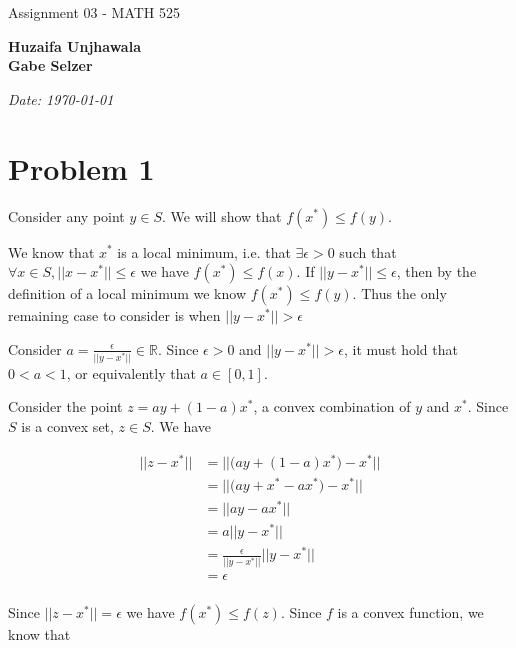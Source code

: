 \documentclass[11pt]{article}
\begin{document}
\begin{titlepage}
    \centering
    \vspace*{0.5cm}
    \par\normalfont\fontsize{35}{35}\sffamily\selectfont
    Assignment 03 - MATH 525\par 
    \vspace*{1cm}
    {\huge\bfseries Huzaifa Unjhawala \\  Gabe Selzer \par} 
    \vspace*{1cm}
    {\Large\itshape Date: \today\par} 
    \vfill
\end{titlepage}

\tableofcontents
\newpage
\section*{Problem 1}

Consider any point $y\in S$. We will show that $f(x^*)\leq f(y)$.

We know that $x^*$ is a local minimum, i.e. that $\exists\epsilon>0$ such that $\forall x\in S, ||x-x^*||\leq \epsilon$ we have $f(x^*)\leq f(x)$. If $||y-x^*||\leq \epsilon$, then by the definition of a local minimum we know $f(x^*)\leq f(y)$. Thus the only remaining case to consider is when $||y-x^*||>\epsilon$

Consider $a=\frac{\epsilon}{||y-x^*||}\in\mathbb{R}$. Since $\epsilon> 0$ and $||y-x^*||>\epsilon$, it must hold that $0<a<1$, or equivalently that $a\in[0, 1]$.

Consider the point $z=ay + (1-a)x^*$, a convex combination of $y$ and $x^*$. Since $S$ is a convex set, $z\in S$. We have

\begin{equation}
\begin{split}
||z-x^*|| &= ||\bigl(ay + (1-a)x^*\bigr) - x^*|| \\
&= ||\bigl(ay + x^*-ax^*\bigr) - x^*|| \\
&= ||ay -ax^*|| \\
&= a||y -x^*|| \\
&= \frac{\epsilon}{||y-x^*||}||y -x^*|| \\
&= \epsilon\\
\end{split}
\end{equation}

Since $||z-x^*|| = \epsilon$ we have $f(x^*)\leq f(z)$. Since $f$ is a convex function, we know that
\end{document}
